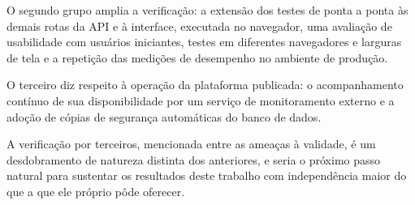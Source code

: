 O segundo grupo amplia a verificação: a extensão dos testes de ponta a ponta às demais rotas da API e à interface, executada no navegador, uma avaliação de usabilidade com usuários iniciantes, testes em diferentes navegadores e larguras de tela e a repetição das medições de desempenho no ambiente de produção.

O terceiro diz respeito à operação da plataforma publicada: o acompanhamento contínuo de sua disponibilidade por um serviço de monitoramento externo e a adoção de cópias de segurança automáticas do banco de dados.

A verificação por terceiros, mencionada entre as ameaças à validade, é um desdobramento de natureza distinta dos anteriores, e seria o próximo passo natural para sustentar os resultados deste trabalho com independência maior do que a que ele próprio pôde oferecer.
